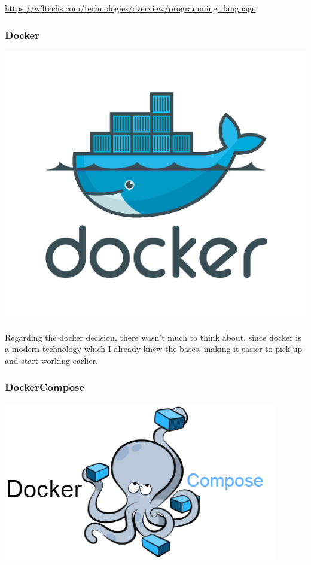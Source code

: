 \documentclass[11pt]{article}
\begin{document}
        \url{https://w3techs.com/technologies/overview/programming_language}

        \subsubsection[Docker]{Docker}

        \begin{center}
            \includegraphics[scale=0.3]{logo_docker}
        \end{center}

        \begin{flushleft}
            Regarding the docker decision, there wasn't much to think about, since docker is a modern technology which I
            already knew the bases, making it easier to pick up and start working earlier.
        \end{flushleft}

        \newpage
        \subsubsection[Docker-compose]{DockerCompose}

        \begin{center}
            \includegraphics[scale=0.4]{logo_docker_compose}
        \end{center}
\end{document}
